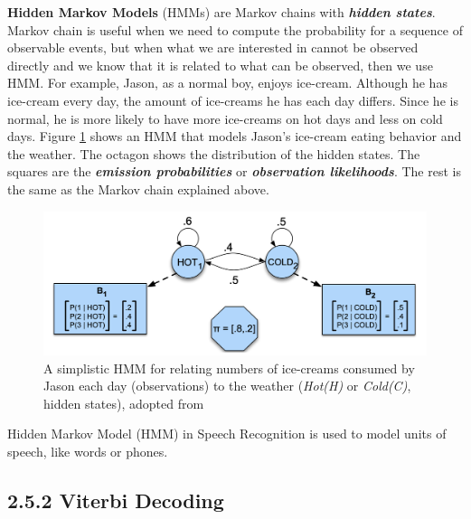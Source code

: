 \documentclass[nobib]{tufte-handout}
\begin{document}
\textbf{Hidden Markov Models} (HMMs) are Markov chains with \textbf{\textit{hidden states}}. Markov chain is useful when we need to compute the probability for a sequence of observable events, but when what we are interested in cannot be observed directly and we know that it is related to what can be observed, then we use HMM. For example, Jason, as a normal boy, enjoys ice-cream. Although he has ice-cream every day, the amount of ice-creams he has each day differs. Since he is normal, he is more likely to have more ice-creams on hot days and less on cold days. Figure \ref{fig:hmm} shows an HMM that models Jason's ice-cream eating behavior and the weather. The octagon shows the distribution of the hidden states. The squares are the \textbf{\textit{emission probabilities}} or \textbf{\textit{observation likelihoods}}. The rest is the same as the Markov chain explained above.\\
\vspace{5em}
\begin{figure}
 \includegraphics[width=1\textwidth]{hmm.png}
  \caption{A simplistic HMM for relating numbers of ice-creams consumed by Jason each day (observations) to the weather (\textit{Hot(H)} or \textit{Cold(C)}, hidden states), adopted from \cite{slp}}
  \label{fig:hmm}
\end{figure}
Hidden Markov Model (HMM) in Speech Recognition is used to model units of speech, like words or phones.

\subsection{2.5.2 \textbf{Viterbi Decoding}}
\end{document}

